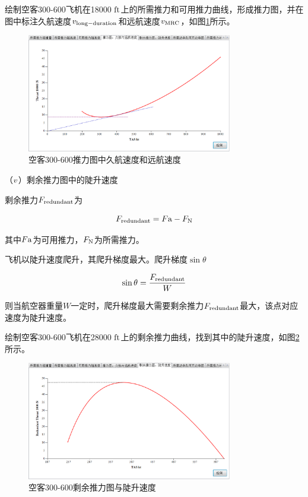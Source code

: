 \documentclass[a4paper,punct,space,heading=true,AutoFakeBold]{ctexrep}
\begin{document}
绘制空客300-600飞机在18000 $\rm ft$上的所需推力和可用推力曲线，形成推力图，并在图中标注久航速度$v_{\rm long-duration}$和远航速度$v_{\rm MRC}$，如图\ref{vlongduranceandmrc}所示。

\begin{figure}[h]
	\centering
	\includegraphics[width=0.8\textwidth]{pic/vlongduranceandmrc.eps}\hspace{30pt}
	\caption{空客300-600推力图中久航速度和远航速度}\label{vlongduranceandmrc}
\end{figure}




（$\romannumeral5$）剩余推力图中的陡升速度

剩余推力$F_{\rm redundant}$为

\begin{equation}
F_{\rm redundant}=F{\rm a}-F_{\rm N}
\end{equation}

其中$F{\rm a}$为可用推力，$F_{\rm N}$为所需推力。

飞机以陡升速度爬升，其爬升梯度最大。爬升梯度$\sin\theta$

\begin{equation}\label{sintheta}
\sin\theta=\frac{F_{\rm redundant}}{W}
\end{equation}

则当航空器重量$W$一定时，爬升梯度最大需要剩余推力$F_{\rm redundant}$最大，该点对应速度为陡升速度。

绘制空客300-600飞机在28000 $\rm ft$上的剩余推力曲线，找到其中的陡升速度，如图\ref{vsteepclimbinredundantF}所示。

\begin{figure}[h]
	\centering
	\includegraphics[width=0.8\textwidth]{pic/vsteepclimbinredundantF.eps}\hspace{30pt}
	\caption{空客300-600剩余推力图与陡升速度}\label{vsteepclimbinredundantF}
\end{figure}
\end{document}
